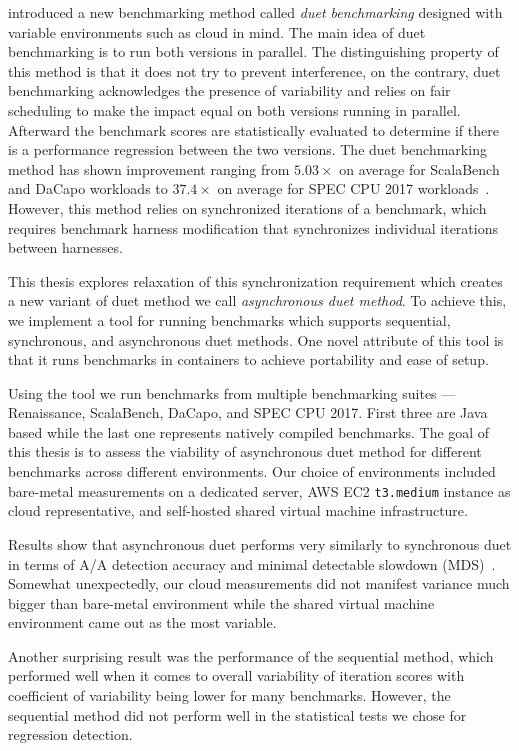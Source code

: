 \citet{bulej2020duet} introduced a new benchmarking method called \emph{duet benchmarking} designed with variable environments such as cloud in mind.
The main idea of duet benchmarking is to run both versions in parallel.
The distinguishing property of this method is that it does not try to prevent interference, on the contrary, duet benchmarking acknowledges the presence of variability and relies on fair scheduling to make the impact equal on both versions running in parallel.
Afterward the benchmark scores are statistically evaluated to determine if there is a performance regression between the two versions.
The duet benchmarking method has shown improvement ranging from $5.03 \times$ on average for ScalaBench and DaCapo workloads to $37.4 \times$ on average for SPEC CPU 2017 workloads~\cite{bulej2022duet}.
However, this method relies on synchronized iterations of a benchmark, which requires benchmark harness modification that synchronizes individual iterations between harnesses.

This thesis explores relaxation of this synchronization requirement which creates a new variant of duet method we call \emph{asynchronous duet method}.
To achieve this, we implement a tool for running benchmarks which supports sequential, synchronous, and asynchronous duet methods.
One novel attribute of this tool is that it runs benchmarks in containers to achieve portability and ease of setup.

Using the tool we run benchmarks from multiple benchmarking suites --- Renaissance, ScalaBench, DaCapo, and SPEC CPU 2017.
First three are Java based while the last one represents natively compiled benchmarks.
The goal of this thesis is to assess the viability of asynchronous duet method for different benchmarks across different environments.
Our choice of environments included bare-metal measurements on a dedicated server, AWS EC2 \lstinline{t3.medium} instance as cloud representative, and self-hosted shared virtual machine infrastructure.

Results show that asynchronous duet performs very similarly to synchronous duet in terms of A/A detection accuracy and minimal detectable slowdown (MDS)~\cite{laaber2019software}.
Somewhat unexpectedly, our cloud measurements did not manifest variance much bigger than bare-metal environment while the shared virtual machine environment came out as the most variable.

Another surprising result was the performance of the sequential method, which performed well when it comes to overall variability of iteration scores with coefficient of variability being lower for many benchmarks.
However, the sequential method did not perform well in the statistical tests we chose for regression detection.


